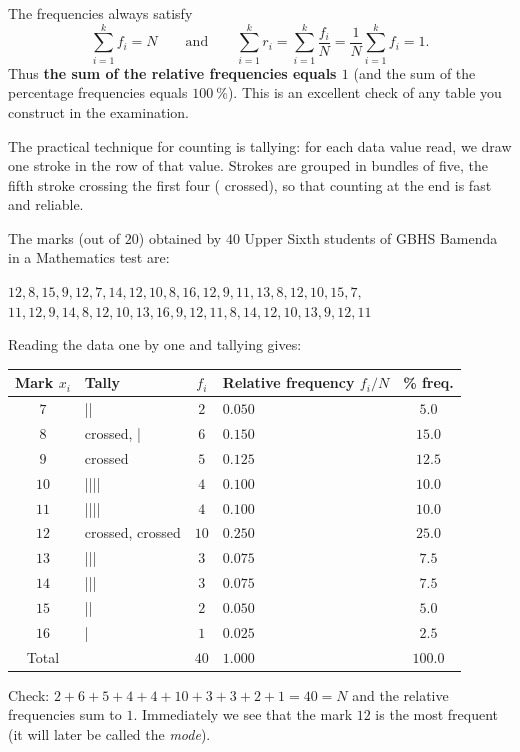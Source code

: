 \documentclass[11pt]{article}
\newcommand{\cle}[1]{{\popxbold\color{popdark}#1}}
\begin{document}
\begin{propriete}
The frequencies always satisfy
\[ \sum_{i=1}^{k} f_i = N \qquad \text{and} \qquad \sum_{i=1}^{k} r_i = \sum_{i=1}^{k}\frac{f_i}{N} = \frac{1}{N}\sum_{i=1}^{k} f_i = 1. \]
Thus \textbf{the sum of the relative frequencies equals $1$} (and the sum of the percentage frequencies equals $100\ \%$). This is an excellent check of any table you construct in the examination.
\end{propriete}

The practical technique for counting is \cle{tallying}: for each data value read, we draw one stroke in the row of that value. Strokes are grouped in bundles of five, the fifth stroke crossing the first four (\text{||||} crossed), so that counting at the end is fast and reliable.

\begin{exemplebox}
The marks (out of $20$) obtained by $40$ Upper Sixth students of GBHS Bamenda in a Mathematics test are:
\begin{center}
$12, 8, 15, 9, 12, 7, 14, 12, 10, 8, 16, 12, 9, 11, 13, 8, 12, 10, 15, 7,$\\
$11, 12, 9, 14, 8, 12, 10, 13, 16, 9, 12, 11, 8, 14, 12, 10, 13, 9, 12, 11$
\end{center}
Reading the data one by one and tallying gives:
\begin{center}
\begin{tabularx}{\linewidth}{|c|l|c|X|c|}
\hline
\rowcolor{popblueL} Mark $x_i$ & Tally & $f_i$ & Relative frequency $f_i/N$ & \% freq. \\
\hline
$7$ & || & $2$ & $0.050$ & $5.0$ \\
\hline
$8$ & \text{||||} crossed, | & $6$ & $0.150$ & $15.0$ \\
\hline
$9$ & \text{||||} crossed & $5$ & $0.125$ & $12.5$ \\
\hline
$10$ & |||| & $4$ & $0.100$ & $10.0$ \\
\hline
$11$ & |||| & $4$ & $0.100$ & $10.0$ \\
\hline
$12$ & \text{||||} crossed, \text{||||} crossed & $10$ & $0.250$ & $25.0$ \\
\hline
$13$ & ||| & $3$ & $0.075$ & $7.5$ \\
\hline
$14$ & ||| & $3$ & $0.075$ & $7.5$ \\
\hline
$15$ & || & $2$ & $0.050$ & $5.0$ \\
\hline
$16$ & | & $1$ & $0.025$ & $2.5$ \\
\hline
\rowcolor{popblueL} Total & & $40$ & $1.000$ & $100.0$ \\
\hline
\end{tabularx}
\end{center}
Check: $2+6+5+4+4+10+3+3+2+1 = 40 = N$ and the relative frequencies sum to $1$. Immediately we see that the mark $12$ is the most frequent (it will later be called the \emph{mode}).
\end{exemplebox}
\end{document}
